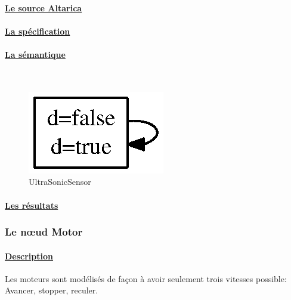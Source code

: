     \paragraph{\underline{Le source Altarica\\}}
    
    
    \paragraph{\underline{La spécification\\}}
    
    
    \paragraph{\underline{La sémantique\\}}
    ~\\
\begin{figure}[!ht]
     \begin{center}
      \includegraphics{../src/altarica/UltraSonicSensor.eps}
      \caption{UltraSonicSensor}
     \end{center}
    \end{figure}

    \paragraph{\underline{Les résultats\\}}
    
    
   
   \subsubsection{Le n\oe{}ud Motor}
  
    \paragraph{\underline{Description\\}}
    Les moteurs sont modélisés de façon à avoir seulement trois vitesses
    possible: Avancer, stopper, reculer.

